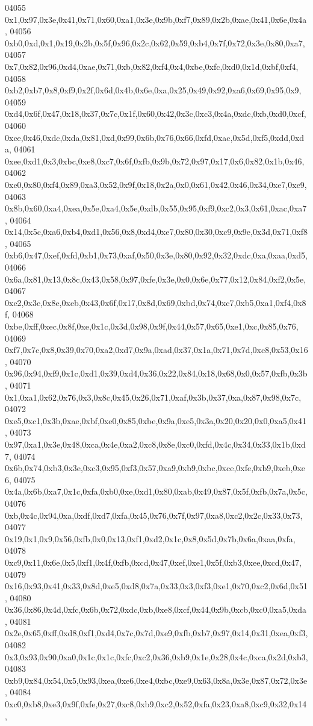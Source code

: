 \begin{DoxyCode}
04055   0x1,0x97,0x3e,0x41,0x71,0x60,0xa1,0x3e,0x9b,0xf7,0x89,0x2b,0xae,0x41,0x6e,0x4a,
04056   0xb0,0xd,0x1,0x19,0x2b,0x5f,0x96,0x2c,0x62,0x59,0xb4,0x7f,0x72,0x3e,0x80,0xa7,
04057   0x7,0x82,0x96,0xd4,0xae,0x71,0xb,0x82,0xf4,0x4,0xbe,0xfc,0xd0,0x1d,0xbf,0xf4,
04058   0xb2,0xb7,0x8,0xf9,0x2f,0x6d,0x4b,0x6e,0xa,0x25,0x49,0x92,0xa6,0x69,0x95,0x9,
04059   0xd4,0x6f,0x47,0x18,0x37,0x7c,0x1f,0x60,0x42,0x3c,0xc3,0x4a,0xdc,0xb,0xd0,0xcf,
04060   0xce,0x46,0xdc,0xda,0x81,0xd,0x99,0x6b,0x76,0x66,0xfd,0xac,0x5d,0xf5,0xdd,0xda,
04061   0xee,0xd1,0x3,0xbc,0xe8,0xc7,0x6f,0xfb,0x9b,0x72,0x97,0x17,0x6,0x82,0x1b,0x46,
04062   0xe0,0x80,0xf4,0x89,0xa3,0x52,0x9f,0x18,0x2a,0x0,0x61,0x42,0x46,0x34,0xe7,0xe9,
04063   0x8b,0x60,0xa4,0xea,0x5e,0xa4,0x5e,0xdb,0x55,0x95,0xf9,0xc2,0x3,0x61,0xac,0xa7,
04064   0x14,0x5c,0xa6,0xb4,0xd1,0x56,0x8,0xd4,0xe7,0x80,0x30,0xc9,0x9e,0x3d,0x71,0xf8,
04065   0xb6,0x47,0xef,0xfd,0xb1,0x73,0xaf,0x50,0x3e,0x80,0x92,0x32,0xdc,0xa,0xaa,0xd5,
04066   0x6a,0x81,0x13,0x8c,0x43,0x58,0x97,0xfe,0x3e,0x0,0x6e,0x77,0x12,0x84,0xf2,0x5e,
04067   0xe2,0x3e,0x8e,0xeb,0x43,0x6f,0x17,0x8d,0x69,0xbd,0x74,0xc7,0xb5,0xa1,0xf4,0x8f,
04068   0xbe,0xff,0xec,0x8f,0xe,0x1c,0x3d,0x98,0x9f,0x44,0x57,0x65,0xe1,0xc,0x85,0x76,
04069   0xf7,0x7c,0x8,0x39,0x70,0xa2,0xd7,0x9a,0xad,0x37,0x1a,0x71,0x7d,0xc8,0x53,0x16,
04070   0x96,0x94,0xf9,0x1c,0xd1,0x39,0xd4,0x36,0x22,0x84,0x18,0x68,0x0,0x57,0xfb,0x3b,
04071   0x1,0xa1,0x62,0x76,0x3,0x8c,0x45,0x26,0x71,0xaf,0x3b,0x37,0xa,0x87,0x98,0x7c,
04072   0xe5,0xc1,0x3b,0xae,0xbf,0xe0,0x85,0xbe,0x9a,0xe5,0x3a,0x20,0x20,0x0,0xa5,0x41,
04073   0x97,0xa1,0x3e,0x48,0xca,0x4e,0xa2,0xc8,0x8e,0xc0,0xfd,0x4c,0x34,0x33,0x1b,0xd7,
04074   0x6b,0x74,0xb3,0x3e,0xc3,0x95,0xf3,0x57,0xa9,0xb9,0xbc,0xce,0xfe,0xb9,0xeb,0xe6,
04075   0x4a,0x6b,0xa7,0x1c,0xfa,0xb0,0xe,0xd1,0x80,0xab,0x49,0x87,0x5f,0xfb,0x7a,0x5c,
04076   0xb,0x4c,0x94,0xa,0xdf,0xd7,0xfa,0x45,0x76,0x7f,0x97,0xa8,0xc2,0x2c,0x33,0x73,
04077   0x19,0x1,0x9,0x56,0xfb,0x0,0x13,0xf1,0xd2,0x1c,0x8,0x5d,0x7b,0x6a,0xaa,0xfa,
04078   0xc9,0x11,0x6e,0x5,0xf1,0x4f,0xfb,0xcd,0x47,0xef,0xe1,0x5f,0xb3,0xee,0xcd,0x47,
04079   0x16,0x93,0x41,0x33,0x8d,0xe5,0xd8,0x7a,0x33,0x3,0xf3,0xe1,0x70,0xc2,0x6d,0x51,
04080   0x36,0x86,0x4d,0xfc,0x6b,0x72,0xdc,0xb,0xe8,0xcf,0x44,0x9b,0xcb,0xc0,0xa5,0xda,
04081   0x2e,0x65,0xff,0xd8,0xf1,0xd4,0x7c,0x7d,0xe9,0xfb,0xb7,0x97,0x14,0x31,0xea,0xf3,
04082   0x3,0x93,0x90,0xa0,0x1c,0x1c,0xfc,0xc2,0x36,0xb9,0x1e,0x28,0x4c,0xca,0x2d,0xb3,
04083   0xb9,0x84,0x54,0x5,0x93,0xea,0xe6,0xe4,0xbc,0xe9,0x63,0x8a,0x3e,0x87,0x72,0x3e,
04084   0xc0,0xb8,0xe3,0x9f,0xfe,0x27,0xc8,0xb9,0xc2,0x52,0xfa,0x23,0xa8,0xc9,0x32,0x14,

\end{DoxyCode}
